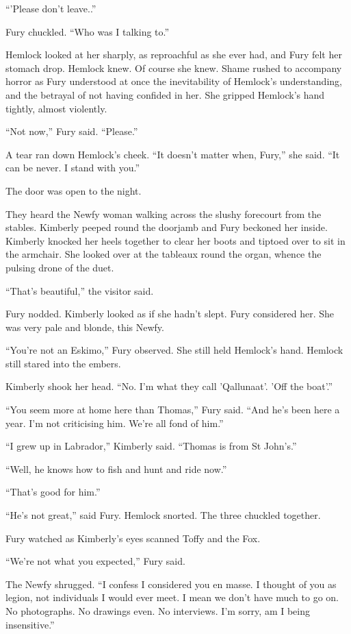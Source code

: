 \documentclass[11pt,a5paper]{article}
\begin{document}
``'Please don't leave..''

Fury chuckled. ``Who was I talking to.''

Hemlock looked at her sharply, as reproachful as she ever had, and Fury felt her stomach drop. Hemlock knew. Of course she knew. Shame rushed to accompany horror as Fury understood at once the inevitability of Hemlock's understanding, and the betrayal of not having confided in her. She gripped Hemlock's hand tightly, almost violently.

``Not now,'' Fury said. ``Please.''

A tear ran down Hemlock's cheek. ``It doesn't matter when, Fury,'' she said. ``It can be never. I stand with you.''

The door was open to the night.

They heard the Newfy woman walking across the slushy forecourt from the stables. Kimberly peeped round the doorjamb and Fury beckoned her inside. Kimberly knocked her heels together to clear her boots and tiptoed over to sit in the armchair. She looked over at the tableaux round the organ, whence the pulsing drone of the duet.

``That's beautiful,'' the visitor said.

Fury nodded. Kimberly looked as if she hadn't slept. Fury considered her. She was very pale and blonde, this Newfy.

``You're not an Eskimo,'' Fury observed. She still held Hemlock's hand. Hemlock still stared into the embers.

Kimberly shook her head. ``No. I'm what they call 'Qallunaat'. 'Off the boat'.''

``You seem more at home here than Thomas,'' Fury said. ``And he's been here a year. I'm not criticising him. We're all fond of him.''

``I grew up in Labrador,'' Kimberly said. ``Thomas is from St John's.''

``Well, he knows how to fish and hunt and ride now.''

``That's good for him.''

``He's not great,'' said Fury. Hemlock snorted. The three chuckled together.

Fury watched as Kimberly's eyes scanned Toffy and the Fox.

``We're not what you expected,'' Fury said.

The Newfy shrugged. ``I confess I considered you en masse. I thought of you as legion, not individuals I would ever meet. I mean we don't have much to go on. No photographs. No drawings even. No interviews. I'm sorry, am I being insensitive.''
\end{document}
